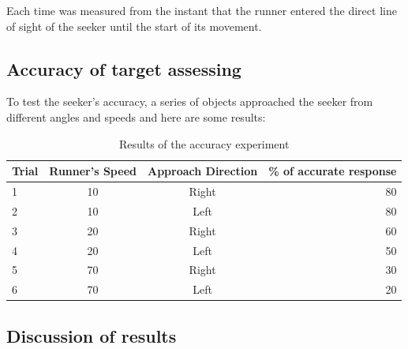 \documentclass[sigconf,nonacm]{acmart}
\begin{document}
Each time was measured from the instant that the runner entered the direct line
of sight of the seeker until the start of its movement.
      


 
\subsection{Accuracy of target assessing}

To test the seeker's accuracy, a series of objects approached the seeker from
different angles and speeds and here are some results:

\begin{table}[h]
      \caption[short]{Results of the accuracy experiment}
      \begin{tabular}{l|c|c|r}
            \toprule
            Trial     &     Runner's Speed  & Approach Direction   & \%
            of accurate response\\
            \midrule    
            1         &     10              & Right   &   80\\
            2         &     10              & Left    &   80\\
            3         &     20              & Right   &   60\\
            4         &     20              & Left    &   50\\
            5         &     70              & Right   &   30\\
            6         &     70              & Left    &   20\\
            \bottomrule
      \end{tabular}
\end{table}

\subsection{Discussion of results}
\end{document}
